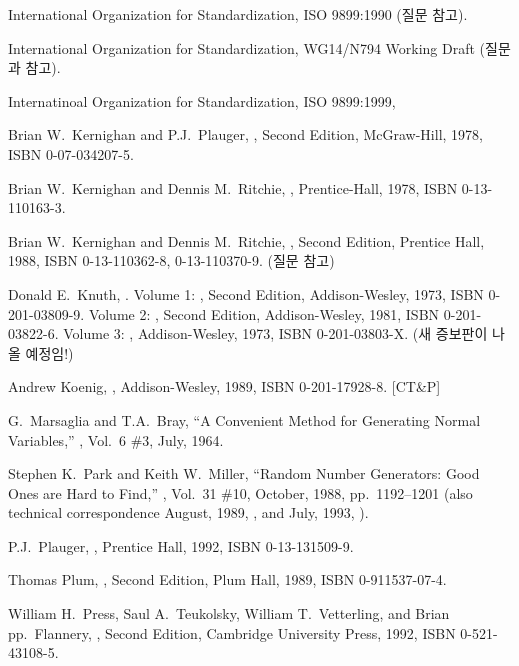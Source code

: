 \begin{thebibliography}{99}
	International Organization for Standardization, ISO 9899:1990
	(질문  참고).

	International Organization for Standardization, WG14/N794 Working Draft
	(질문 과  참고).

	Internatinoal Organization for Standardization, ISO 9899:1999,

	Brian W.\  Kernighan and P.J.\  Plauger,
	,	Second Edition,
	McGraw-Hill, 1978, ISBN 0-07-034207-5.

	Brian W.\  Kernighan and Dennis M.\  Ritchie, 
	,
	Prentice-Hall, 1978, ISBN 0-13-110163-3.

	Brian W.\ Kernighan and Dennis M.\ Ritchie, 
	, Second Edition,
	Prentice Hall, 1988, ISBN 0-13-110362-8, 0-13-110370-9.
	(질문  참고)

	Donald E.\  Knuth, .
	Volume 1: , Second Edition,
	Addison-Wesley, 1973, ISBN 0-201-03809-9.
	Volume 2: , Second Edition,
	Addison-Wesley, 1981, ISBN 0-201-03822-6.   
	Volume 3: , 
	Addison-Wesley, 1973, ISBN 0-201-03803-X.   (새 증보판이 나올 예정임!)

	Andrew Koenig, , Addison-Wesley, 1989,
	ISBN 0-201-17928-8.   [CT\&P]

	G.\  Marsaglia and T.A.\  Bray, ``A Convenient Method for Generating
	Normal Variables,'' , Vol.\  6 \#3, July, 1964.

	Stephen K.\  Park and Keith W.\  Miller, 
	``Random Number Generators: Good
	Ones are Hard to Find,'' , Vol.\ 31 \#10,
	October, 1988, pp.\  1192--1201 (also technical correspondence August,
	1989, , and July, 1993, ).

	P.J.\ Plauger, , Prentice Hall, 1992,
	ISBN 0-13-131509-9.

	Thomas Plum, , Second Edition, Plum Hall,
	1989, ISBN 0-911537-07-4.

	William H.\  Press, Saul A.\  Teukolsky, William T.\  Vetterling,
	and Brian pp.\  Flannery,
	, Second Edition, Cambridge University
	Press, 1992, ISBN 0-521-43108-5.


\end{thebibliography}
